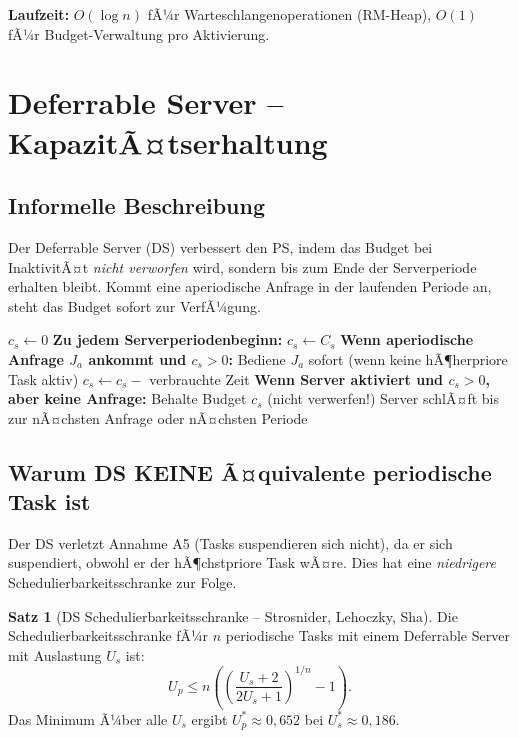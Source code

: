 ﻿\documentclass[a4paper,12pt]{report}
\theoremstyle{definition}
\newtheorem{satz}{Satz}[chapter]
\begin{document}
\textbf{Laufzeit:} $O(\log n)$ fÃ¼r Warteschlangenoperationen (RM-Heap),
$O(1)$ fÃ¼r Budget-Verwaltung pro Aktivierung.

\section{Deferrable Server -- KapazitÃ¤tserhaltung}

\subsection{Informelle Beschreibung}

Der Deferrable Server (DS) verbessert den PS, indem das Budget bei InaktivitÃ¤t
\emph{nicht verworfen} wird, sondern bis zum Ende der Serverperiode erhalten
bleibt. Kommt eine aperiodische Anfrage in der laufenden Periode an, steht
das Budget sofort zur VerfÃ¼gung.

\begin{algorithm}[H]
	\caption{Deferrable Server}
	\begin{algorithmic}[1]
		\State $c_s \leftarrow 0$ 
		\State
		\State \textbf{Zu jedem Serverperiodenbeginn:}
		\State $c_s \leftarrow C_s$ 
		\State
		\State \textbf{Wenn aperiodische Anfrage $J_a$ ankommt und $c_s > 0$:}
		\State Bediene $J_a$ sofort (wenn keine hÃ¶herpriore Task aktiv)
		\State $c_s \leftarrow c_s - $ verbrauchte Zeit
		\State
		\State \textbf{Wenn Server aktiviert und $c_s > 0$, aber keine Anfrage:}
		\State Behalte Budget $c_s$ (nicht verwerfen!)
		\State Server schlÃ¤ft bis zur nÃ¤chsten Anfrage oder nÃ¤chsten Periode
	\end{algorithmic}
\end{algorithm}

\subsection{Warum DS KEINE Ã¤quivalente periodische Task ist}

Der DS verletzt Annahme A5 (Tasks suspendieren sich nicht), da er sich
suspendiert, obwohl er der hÃ¶chstpriore Task wÃ¤re. Dies hat eine \emph{niedrigere}
Schedulierbarkeitsschranke zur Folge.

\begin{satz}[DS Schedulierbarkeitsschranke -- Strosnider, Lehoczky, Sha]
	\label{satz:ds}
	Die Schedulierbarkeitsschranke fÃ¼r $n$ periodische Tasks mit einem
	Deferrable Server mit Auslastung $U_s$ ist:
	\[
		U_p \leq n \left(\left(\frac{U_s+2}{2U_s+1}\right)^{1/n} - 1\right).
	\]
	Das Minimum Ã¼ber alle $U_s$ ergibt $U_p^* \approx 0{,}652$ bei $U_s^* \approx 0{,}186$.
\end{satz}
\end{document}
